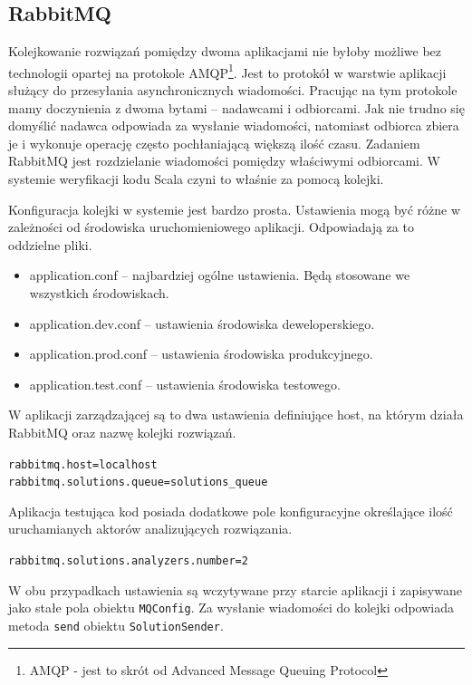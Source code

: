 \documentclass[brudnopis]{xmgr}
\begin{document}
\subsection{RabbitMQ}

Kolejkowanie rozwiązań pomiędzy dwoma aplikacjami nie byłoby możliwe bez technologii opartej na protokole AMQP\footnote{AMQP - jest to skrót od Advanced Message Queuing Protocol}. Jest to protokół w warstwie aplikacji służący do przesyłania asynchronicznych wiadomości. Pracując na tym protokole mamy doczynienia z dwoma bytami -- nadawcami i odbiorcami. Jak nie trudno się domyślić nadawca odpowiada za wysłanie wiadomości, natomiast odbiorca zbiera je i wykonuje operację często pochłaniającą większą ilość czasu. Zadaniem RabbitMQ jest rozdzielanie wiadomości pomiędzy właściwymi odbiorcami. W systemie weryfikacji kodu Scala czyni to właśnie za pomocą kolejki.

Konfiguracja kolejki w systemie jest bardzo prosta. Ustawienia mogą być różne w zależności od środowiska uruchomieniowego aplikacji. Odpowiadają za to oddzielne pliki.

\begin{itemize}
\item application.conf -- najbardziej ogólne ustawienia. Będą stosowane we wszystkich środowiskach.
\item application.dev.conf -- ustawienia środowiska deweloperskiego.
\item application.prod.conf -- ustawienia środowiska produkcyjnego.
\item application.test.conf -- ustawienia środowiska testowego.
\end{itemize} 

W aplikacji zarządzającej są to dwa ustawienia definiujące host, na którym działa RabbitMQ oraz nazwę kolejki rozwiązań.

\begin{alltt}
rabbitmq.host=localhost
rabbitmq.solutions.queue=solutions_queue
\end{alltt}

Aplikacja testująca kod posiada dodatkowe pole konfiguracyjne określające ilość uruchamianych aktorów analizujących rozwiązania.

\begin{alltt}
rabbitmq.solutions.analyzers.number=2
\end{alltt}

W obu przypadkach ustawienia są wczytywane przy starcie aplikacji i zapisywane jako stałe pola obiektu \texttt{MQConfig}. Za wysłanie wiadomości do kolejki odpowiada metoda \texttt{send} obiektu \texttt{SolutionSender}.
\end{document}

